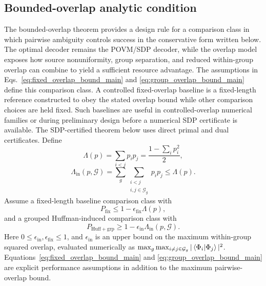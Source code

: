 \documentclass[
 reprint,
 amsmath,amssymb,
 aps,
 pra,
 floatfix,
]{revtex4-2}
\begin{document}
\subsection{Bounded-overlap analytic condition}

The bounded-overlap theorem provides a design rule for a comparison class in which pairwise ambiguity controls success in the conservative form written below. The optimal decoder remains the POVM/SDP decoder, while the overlap model exposes how source nonuniformity, group separation, and reduced within-group overlap can combine to yield a sufficient resource advantage.
The assumptions in Eqs.~\eqref{eq:fixed_overlap_bound_main} and \eqref{eq:group_overlap_bound_main} define this comparison class. A controlled fixed-overlap baseline is a fixed-length reference constructed to obey the stated overlap bound while other comparison choices are held fixed. Such baselines are useful in controlled-overlap numerical families or during preliminary design before a numerical SDP certificate is available. The SDP-certified theorem below uses direct primal and dual certificates.
Define
\begin{equation}
    \Lambda(p)=\sum_{i<j}p_ip_j=\frac{1-\sum_ip_i^2}{2},
\end{equation}
\begin{equation}
    \Lambda_{\mathrm{in}}(p,\mathcal G)=\sum_g\sum_{\substack{i<j\\ i,j\in\mathcal G_g}}p_ip_j\le \Lambda(p).
\end{equation}
Assume a fixed-length baseline comparison class with
\begin{equation}
    P_{\mathrm{fix}}\le 1-\epsilon_{\mathrm{fix}}\Lambda(p),
    \label{eq:fixed_overlap_bound_main}
\end{equation}
and a grouped Huffman-induced comparison class with
\begin{equation}
    P_{\mathrm{Huff+grp}}\ge 1-\epsilon_{\mathrm{in}}\Lambda_{\mathrm{in}}(p,\mathcal G).
    \label{eq:group_overlap_bound_main}
\end{equation}
Here \(0\leq\epsilon_{\mathrm{in}},\epsilon_{\mathrm{fix}}\leq1\), and $\epsilon_{\mathrm{in}}$ is an upper bound on the maximum within-group squared overlap, evaluated numerically as $\max_g\max_{i\ne j\in\mathcal G_g}|\braket{\Phi_i|\Phi_j}|^2$. Equations~\eqref{eq:fixed_overlap_bound_main} and \eqref{eq:group_overlap_bound_main} are explicit performance assumptions in addition to the maximum pairwise-overlap bound.
\end{document}
